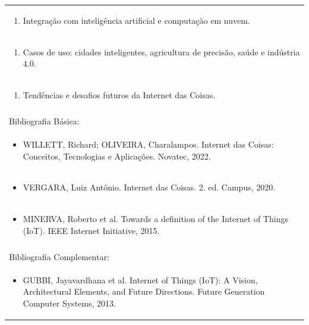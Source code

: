\documentclass[11pt]{article}
\begin{document}
\begin{center}
\begin{longtable}{|p{4cm}|p{4cm}|p{4cm}|p{4cm}|}
\multicolumn{4}{|p{\dimexpr 16cm + 6\tabcolsep\relax}|}{\begin{enumerate}[start=8]\item Integração com inteligência artificial e computação em nuvem.\end{enumerate}}\\
\multicolumn{4}{|p{\dimexpr 16cm + 6\tabcolsep\relax}|}{\begin{enumerate}[start=9]\item Casos de uso: cidades inteligentes, agricultura de precisão, saúde e indústria 4.0.\end{enumerate}}\\
\multicolumn{4}{|p{\dimexpr 16cm + 6\tabcolsep\relax}|}{\begin{enumerate}[start=10]\item Tendências e desafios futuros da Internet das Coisas.\end{enumerate}}\\
\multicolumn{4}{|p{\dimexpr 16cm + 6\tabcolsep\relax}|}{}\\
\hline
\multicolumn{4}{|p{16cm}|}{Bibliografia Básica:}\\*
\multicolumn{4}{|p{\dimexpr 16cm + 6\tabcolsep\relax}|}{\begin{itemize}\item WILLETT, Richard; OLIVEIRA, Charalampos. Internet das Coisas: Conceitos, Tecnologias e Aplicações. Novatec, 2022.\end{itemize}}\\
\multicolumn{4}{|p{\dimexpr 16cm + 6\tabcolsep\relax}|}{\begin{itemize}\item VERGARA, Luiz Antônio. Internet das Coisas. 2. ed. Campus, 2020.\end{itemize}}\\
\multicolumn{4}{|p{\dimexpr 16cm + 6\tabcolsep\relax}|}{\begin{itemize}\item MINERVA, Roberto et al. Towards a definition of the Internet of Things (IoT). IEEE Internet Initiative, 2015.\end{itemize}}\\
\multicolumn{4}{|p{16cm}|}{}\\
\hline
\multicolumn{4}{|p{16cm}|}{Bibliografia Complementar:}\\*
\multicolumn{4}{|p{\dimexpr 16cm + 6\tabcolsep\relax}|}{\begin{itemize}\item GUBBI, Jayavardhana et al. Internet of Things (IoT): A Vision, Architectural Elements, and Future Directions. Future Generation Computer Systems, 2013.\end{itemize}}\\

\end{longtable}
\end{center}
\end{document}
